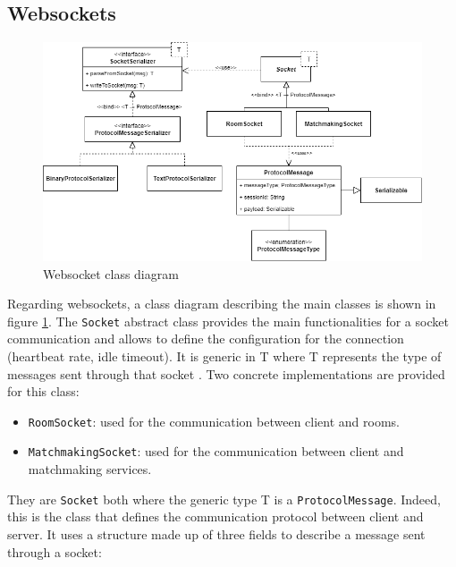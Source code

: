 \subsection{Websockets}
\begin{figure}[h]
	\hspace*{-0.5in}
	\includegraphics[scale=0.6]{images/4-design/communication_protocol.png}
	\caption{Websocket class diagram}
	\label{fig:websocket_communication_design}
\end{figure}
Regarding websockets, a class diagram describing the main classes is shown in figure \ref{fig:websocket_communication_design}.
The \texttt{Socket} abstract class provides the main functionalities for a socket communication and allows to define the configuration for the connection (heartbeat rate, idle timeout). It is generic in T where T represents the type of messages sent through that socket . Two concrete implementations are provided for this class:
\begin{itemize}
	\item \texttt{RoomSocket}: used for the communication between client and rooms.
	\item \texttt{MatchmakingSocket}: used for the communication between client and matchmaking services.
\end{itemize}
They are \texttt{Socket} both where the generic type T is a \texttt{ProtocolMessage}. Indeed, this is the class that defines the communication protocol between client and server. It uses a structure made up of three fields to describe a message sent through a socket:
